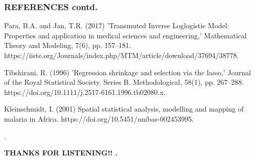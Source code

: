 \documentclass{beamer}
\begin{document}
\begin{frame}
	\frametitle{\textbf{REFERENCES contd.}}
\begin{center}
	\begin{thebibliography}{99}

          Para, B.A. and Jan, T.R. (2017) 'Transmuted Inverse Loglogistic Model: Properties and application in medical sciences and engineering,' Mathematical Theory and Modeling, 7(6), pp. 157–181. https://iiste.org/Journals/index.php/MTM/article/download/37694/38778.

         Tibshirani, R. (1996) 'Regression shrinkage and selection via the lasso,' Journal of the Royal Statistical Society. Series B. Methodological, 58(1), pp. 267–288. https://doi.org/10.1111/j.2517-6161.1996.tb02080.x.

         Kleinschmidt, I. (2001) Spatial statistical analysis, modelling and mapping of malaria in Africa. https://doi.org/10.5451/unibas-002453995.

       .\\

		
			
\end{thebibliography}
\end{center}	
\end{frame}


\begin{frame}
		
		\begin{center}
			{{\Huge { \textbf{THANKS FOR LISTENING!! .}}} \\~\\ }
		\end{center} 
		
	\end{frame}		
\end{document}
